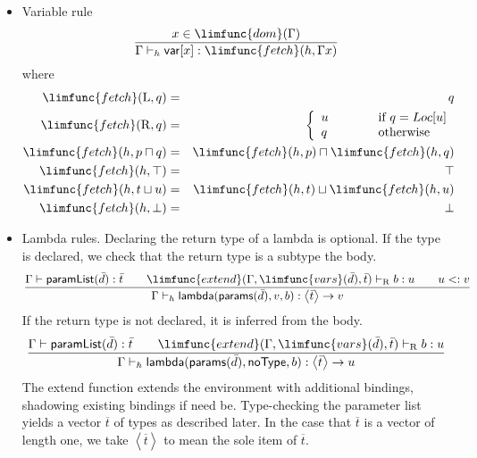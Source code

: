 \documentclass[12pt]{article}
\begin{document}
\begin{itemize}
\item Variable rule%
\begin{equation*}
\frac{x\in \limfunc{dom}(\Gamma )}{\Gamma \vdash _{h}\mathsf{var}[x]:%
\limfunc{fetch}(h,\Gamma x)}
\end{equation*}%
where%
\begin{eqnarray*}
\limfunc{fetch}(\mathrm{L},q) &=&q \\
\limfunc{fetch}(\mathrm{R},q) &=&\left\{ 
\begin{array}{lll}
u & \qquad & \text{if }q=Loc[u] \\ 
q &  & \text{otherwise}%
\end{array}%
\right. \\
\limfunc{fetch}(h,p\sqcap q) &=&\limfunc{fetch}(h,p)\sqcap \limfunc{fetch}%
(h,q) \\
\limfunc{fetch}(h,\top ) &=&\top \\
\limfunc{fetch}(h,t\sqcup u) &=&\limfunc{fetch}(h,t)\sqcup \limfunc{fetch}%
(h,u) \\
\limfunc{fetch}(h,\bot ) &=&\bot
\end{eqnarray*}

\item Lambda rules. Declaring the return type of a lambda is optional. If
the type is declared, we check that the return type is a subtype the body.%
\begin{equation*}
\frac{\Gamma \vdash \mathsf{paramList}(\bar{d}):\bar{t}\qquad \limfunc{extend%
}(\Gamma ,\limfunc{vars}(\bar{d}),\bar{t})\vdash _{\mathrm{R}}b:u\qquad u<:v%
}{\Gamma \vdash _{h}\mathsf{lambda}(\mathsf{params}(\bar{d}%
),v,b):\left\langle \bar{t}\right\rangle \rightarrow v}
\end{equation*}%
If the return type is not declared, it is inferred from the body.%
\begin{equation*}
\frac{\Gamma \vdash \mathsf{paramList}(\bar{d}):\bar{t}\qquad \limfunc{extend%
}(\Gamma ,\limfunc{vars}(\bar{d}),\bar{t})\vdash _{\mathrm{R}}b:u}{\Gamma
\vdash _{h}\mathsf{lambda}(\mathsf{params}(\bar{d}),\mathsf{noType}%
,b):\left\langle \bar{t}\right\rangle \rightarrow u}
\end{equation*}%
The extend function extends the environment with additional bindings,
shadowing existing bindings if need be. Type-checking the parameter list
yields a vector $\overline{t}$ of types as described later. In the case that 
$\overline{t}$ is a vector of length one, we take $\left\langle \overline{t}%
\right\rangle $ to mean the sole item of $\overline{t}$.


\end{itemize}
\end{document}
